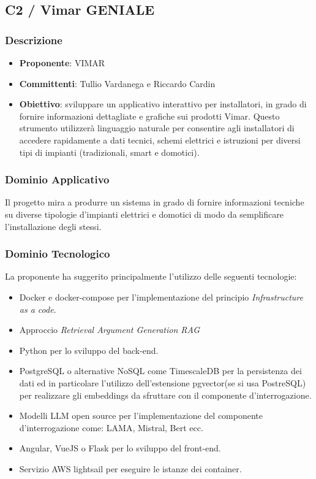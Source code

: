 \documentclass[a4paper, 12pt]{article}
\begin{document}
\subsection{C2 / Vimar GENIALE}

\subsubsection{Descrizione}
\begin{itemize}
    \item \textbf{Proponente}: VIMAR
    \item \textbf{Committenti}: Tullio Vardanega e Riccardo Cardin
    \item \textbf{Obiettivo}: sviluppare un applicativo interattivo per installatori, in grado di fornire informazioni dettagliate e grafiche sui prodotti Vimar. 
    Questo strumento utilizzerà linguaggio naturale per consentire agli installatori di accedere rapidamente a dati tecnici, schemi elettrici e istruzioni per diversi tipi di impianti (tradizionali, smart e domotici).    
\end{itemize}

\subsubsection{Dominio Applicativo}
Il progetto mira a produrre un sistema in grado di fornire informazioni tecniche su diverse tipologie d'impianti elettrici e domotici di modo da semplificare l’installazione degli stessi.

\subsubsection{Dominio Tecnologico}
La proponente ha suggerito principalmente l’utilizzo delle seguenti tecnologie:
\begin{itemize}
    \item Docker e docker-compose per l’implementazione del principio \textit{Infrastructure as a code}.
    \item Approccio\textit{ Retrieval Argument Generation RAG}
    \item Python per lo sviluppo del back-end.
    \item PostgreSQL o alternative NoSQL come TimescaleDB per la persistenza dei dati ed in particolare l’utilizzo dell’estensione pgvector(se si usa PostreSQL) per realizzare gli embeddings da sfruttare con il componente d'interrogazione.
    \item Modelli LLM open source per l’implementazione del componente d'interrogazione come: LAMA, Mistral, Bert ecc.
    \item Angular, VueJS o Flask per lo sviluppo del front-end.
    \item Servizio AWS lightsail per eseguire le istanze dei container.
\end{itemize}
\end{document}
